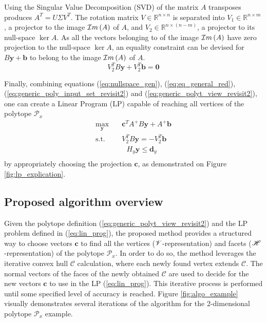 Using the Singular Value Decomposition (SVD) \cite{klema_singular_1980} of the matrix $A$ transposes produces $A^T = U\Sigma V^T$. The rotation matrix $V \in \mathbb{R}^{n\times n }$ is separated into  $V_1\in \mathbb{R}^{n\times m}$, a projector to the image $\mathcal{I}m\left(A\right)$ of $A$, and $V_2\in \mathbb{R}^{n\times(n-m)}$, a projector to its null-space $\ker{A}$. As all the vectors belonging to of the image $\mathcal{I}m\left(A\right)$ have zero projection to the null-space $\ker{A}$, an equality constraint can be devised for $B\bm{y}+\bm{b}$ to belong to the image $\mathcal{I}m\left(A\right)$ of $A$. 
\begin{equation}
    V_2^TB\bm{y} +V_2^T\bm{b}  = \bm{0}
    \label{eq:nullspace_gen}
\end{equation}

Finally, combining equations (\ref{eq:nullspace_gen}), (\ref{eq:eq_general_red}), (\ref{eq:generic_poly_input_set_revisit2}) and (\ref{eq:generic_polyt_view_revisit2}), one can create a Linear Program (LP) capable of reaching all vertices of the polytope $\mathcal{P}_x$
\begin{equation}
\begin{aligned}
    \max_{\bm{y}} \quad &  \bm{c}^TA^{+}B\bm{y} + A^{+}\bm{b}\\
     \textrm{s.t.} \quad &  V_2^TB\bm{y} = -V_2^T\bm{b} \\
          & ~~~  H_y \bm{y} \leq \bm{d}_y \\
\end{aligned}
\label{eq:lin_prog}
\end{equation}
by appropriately choosing the projection $\bm{c}$, as demonstrated on Figure \ref{fig:lp_explication}.



\subsection{Proposed algorithm overview}
\label{ch:method}

Given the polytope definition (\ref{eq:generic_polyt_view_revisit2}) and the LP problem defined in (\ref{eq:lin_prog}), the proposed method provides a structured way to choose vectors $\bm{c}$ to find all the vertices ($\mathscr{V}$-representation) and facets ($\mathscr{H}$-representation) of the polytope $\mathcal{P}_x$. 
In order to do so, the method leverages the iterative convex hull $\mathcal{C}$ calculation, where each newly found vertex extends $\mathcal{C}$. The normal vectors of the faces of the newly obtained $\mathcal{C}$ are used to decide for the new vectors $\bm{c}$ to use in the LP (\ref{eq:lin_prog}). This iterative process is performed until some specified level of accuracy is reached. Figure \ref{fig:algo_example} visually demonstrates several iterations of the algorithm for the 2-dimensional polytope $\mathcal{P}_x$ example.

